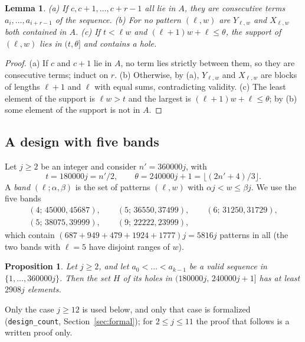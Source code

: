 \documentclass[11pt]{amsart}
\newtheorem{proposition}[theorem]{Proposition}
\newtheorem{lemma}[theorem]{Lemma}
\theoremstyle{remark}
\begin{document}
\begin{lemma}\label{lem:pattern}
\textup{(a)} If $c,c+1,\dots,c+r-1$ all lie in $A$, they are consecutive terms $a_i,\dots,a_{i+r-1}$ of the sequence.
\textup{(b)} For no pattern $(\ell,w)$ are $Y_{\ell,w}$ and $X_{\ell,w}$ both contained in $A$.
\textup{(c)} If $t<\ell w$ and $(\ell+1)w+\ell\le\theta$, the support of $(\ell,w)$ lies in $(t,\theta]$ and contains a hole.
\end{lemma}

\begin{proof}
(a) If $c$ and $c+1$ lie in $A$, no term lies strictly between them, so they are consecutive terms; induct on $r$. (b) Otherwise, by (a),
$Y_{\ell,w}$ and $X_{\ell,w}$ are blocks of lengths $\ell+1$ and $\ell$ with equal sums, contradicting validity. (c) The least element of
the support is $\ell w>t$ and the largest is $(\ell+1)w+\ell\le\theta$; by (b) some element of the support is not in $A$.
\end{proof}

\subsection{A design with five bands}

Let $j\ge2$ be an integer and consider $n'=360000j$, with
\[
  t=180000j=n'/2,\qquad \theta=240000j+1=\lfloor(2n'+4)/3\rfloor .
\]
A \emph{band} $(\ell;\alpha,\beta)$ is the set of patterns $(\ell,w)$ with $\alpha j<w\le\beta j$. We use the five bands
\begin{gather*}
  (4;\,45000,45687),\qquad(5;\,36550,37499),\qquad(6;\,31250,31729),\\
  (5;\,38075,39999),\qquad(9;\,22222,23999),
\end{gather*}
which contain $(687+949+479+1924+1777)j=5816j$ patterns in all (the two bands with $\ell=5$ have disjoint ranges of $w$).

\begin{proposition}\label{prop:design}
Let $j\ge2$, and let $a_0<\dots<a_{k-1}$ be a valid sequence in $\{1,\dots,360000j\}$. Then the set $H$ of its holes in
$(180000j,\,240000j+1]$ has at least $2908j$ elements.
\end{proposition}

Only the case $j\ge12$ is used below, and only that case is formalized (\texttt{design\_count}, Section~\ref{sec:formal}); for
$2\le j\le11$ the proof that follows is a written proof only.
\end{document}
